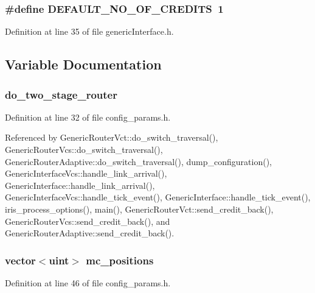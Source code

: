 \subsubsection[{DEFAULT\_\-NO\_\-OF\_\-CREDITS}]{\setlength{\rightskip}{0pt plus 5cm}\#define DEFAULT\_\-NO\_\-OF\_\-CREDITS~1}\label{genericInterface_8h_944a5420832d6aa2a88d533b80b6c016}




Definition at line 35 of file genericInterface.h.

\subsection{Variable Documentation}
\subsubsection[{do\_\-two\_\-stage\_\-router}]{ {\bf do\_\-two\_\-stage\_\-router}}\label{genericInterface_8h_5ef61643d57baddad3f036737403d4cf}




Definition at line 32 of file config\_\-params.h.

Referenced by GenericRouterVct::do\_\-switch\_\-traversal(), GenericRouterVcs::do\_\-switch\_\-traversal(), GenericRouterAdaptive::do\_\-switch\_\-traversal(), dump\_\-configuration(), GenericInterfaceVcs::handle\_\-link\_\-arrival(), GenericInterface::handle\_\-link\_\-arrival(), GenericInterfaceVcs::handle\_\-tick\_\-event(), GenericInterface::handle\_\-tick\_\-event(), iris\_\-process\_\-options(), main(), GenericRouterVct::send\_\-credit\_\-back(), GenericRouterVcs::send\_\-credit\_\-back(), and GenericRouterAdaptive::send\_\-credit\_\-back().
\subsubsection[{mc\_\-positions}]{\setlength{\rightskip}{0pt plus 5cm}vector$<${\bf uint}$>$ {\bf mc\_\-positions}}\label{genericInterface_8h_f58ebe62f79b2e470f0cb7da0f7a7ea5}




Definition at line 46 of file config\_\-params.h.
